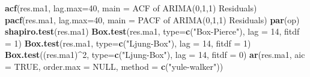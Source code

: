 \documentclass[
]{article}
\newenvironment{Shaded}{\begin{snugshade}}{\end{snugshade}}
\newcommand{\AttributeTok}[1]{\textcolor[rgb]{0.13,0.29,0.53}{#1}}
\newcommand{\ConstantTok}[1]{\textcolor[rgb]{0.56,0.35,0.01}{#1}}
\newcommand{\DecValTok}[1]{\textcolor[rgb]{0.00,0.00,0.81}{#1}}
\newcommand{\FunctionTok}[1]{\textcolor[rgb]{0.13,0.29,0.53}{\textbf{#1}}}
\newcommand{\NormalTok}[1]{#1}
\newcommand{\SpecialCharTok}[1]{\textcolor[rgb]{0.81,0.36,0.00}{\textbf{#1}}}
\newcommand{\StringTok}[1]{\textcolor[rgb]{0.31,0.60,0.02}{#1}}
\begin{document}
\begin{Shaded}
\begin{Highlighting}[]
\FunctionTok{acf}\NormalTok{(res.ma1, }\AttributeTok{lag.max=}\DecValTok{40}\NormalTok{, }\AttributeTok{main =} \StringTok{\textquotesingle{}ACF of ARIMA(0,1,1) Residuals\textquotesingle{}}\NormalTok{)}
\FunctionTok{pacf}\NormalTok{(res.ma1, }\AttributeTok{lag.max=}\DecValTok{40}\NormalTok{, }\AttributeTok{main =} \StringTok{\textquotesingle{}PACF of ARIMA(0,1,1) Residuals\textquotesingle{}}\NormalTok{)}
\FunctionTok{par}\NormalTok{(op)}
\FunctionTok{shapiro.test}\NormalTok{(res.ma1)}
\FunctionTok{Box.test}\NormalTok{(res.ma1, }\AttributeTok{type=}\FunctionTok{c}\NormalTok{(}\StringTok{"Box{-}Pierce"}\NormalTok{), }\AttributeTok{lag =} \DecValTok{14}\NormalTok{, }\AttributeTok{fitdf =} \DecValTok{1}\NormalTok{)}
\FunctionTok{Box.test}\NormalTok{(res.ma1, }\AttributeTok{type=}\FunctionTok{c}\NormalTok{(}\StringTok{"Ljung{-}Box"}\NormalTok{), }\AttributeTok{lag =} \DecValTok{14}\NormalTok{, }\AttributeTok{fitdf =} \DecValTok{1}\NormalTok{)}
\FunctionTok{Box.test}\NormalTok{((res.ma1)}\SpecialCharTok{\^{}}\DecValTok{2}\NormalTok{, }\AttributeTok{type=}\FunctionTok{c}\NormalTok{(}\StringTok{"Ljung{-}Box"}\NormalTok{), }\AttributeTok{lag =} \DecValTok{14}\NormalTok{, }\AttributeTok{fitdf =} \DecValTok{0}\NormalTok{)}
\FunctionTok{ar}\NormalTok{(res.ma1, }\AttributeTok{aic =} \ConstantTok{TRUE}\NormalTok{, }\AttributeTok{order.max =} \ConstantTok{NULL}\NormalTok{, }\AttributeTok{method =} \FunctionTok{c}\NormalTok{(}\StringTok{"yule{-}walker"}\NormalTok{))}


\end{Highlighting}
\end{Shaded}
\end{document}
